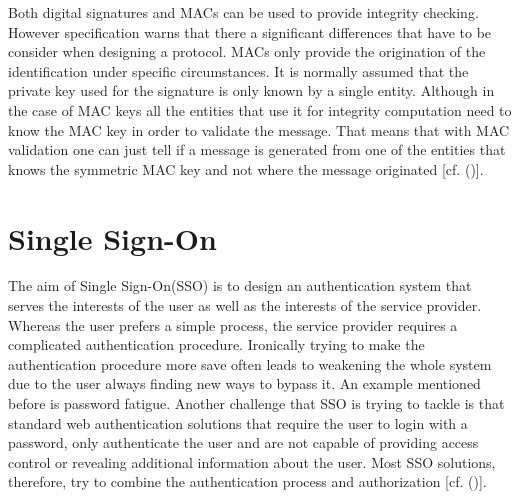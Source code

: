 {{{Both digital signatures and MACs can be used to provide integrity checking. However specification warns that there a significant differences that have to be consider when designing a protocol. MACs only provide the origination of the identification under specific circumstances. It is normally assumed that the private key used for the signature is only known by a single entity. Although in the case of MAC keys all the entities that use it for integrity computation need to know the MAC key in order to validate the message. That means that with MAC validation one can just tell if a message is generated from one of the entities that knows the symmetric MAC key and not where the message originated [cf. (\cite{JWT:IETF:Jones:2015})].

\section{Single Sign-On}


The aim of Single Sign-On(SSO) is to design an authentication system that serves the interests of the user as well as the interests of the service provider. Whereas the user prefers a simple process, the service provider requires a complicated authentication procedure. Ironically trying to make the authentication procedure more save often leads to weakening the whole system due to the user always finding new ways to bypass it. An example mentioned before is password fatigue. Another challenge that SSO is trying to tackle is that standard web authentication solutions that require the user to login with a password, only authenticate the user and are not capable of providing access control or revealing additional information about the user. Most SSO solutions, therefore, try to combine the authentication process and authorization [cf. (\cite{Prochazka:2010:UCA})].

}}}
